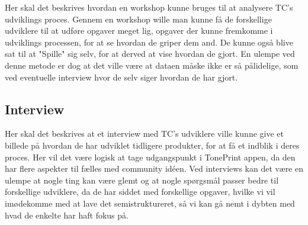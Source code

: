 Her skal det beskrives hvordan en workshop kunne bruges til at analysere TC's udviklings proces. Gennem en workshop wille man kunne få de forskellige udviklere til at udføre opgaver meget lig, opgaver der kunne fremkomme i udviklings processen, for at se hvordan de griper dem and. De kunne også blive sat til at "Spille" sig selv, for at derved at vise hvordan de gjort. En ulempe ved denne metode er dog at det ville være at dataen måske ikke er så pålidelige, som ved eventuelle interview hvor de selv siger hvordan de har gjort.

\subsection*{Interview}
\label{MethodInterview}
Her skal det beskrives at et interview med TC's udviklere ville kunne give et billede på hvordan de har udviklet tidligere produkter, for at få et indblik i deres proces. Her vil det være logisk at tage udgangspunkt i TonePrint appen, da den har flere aspekter til fælles med community idéen. Ved interviews kan det være en ulempe at nogle ting kan være glemt og at nogle spørgsmål passer bedre til forskellige udviklere, da de har siddet med forskellige opgaver, hvilke vi vil imødekomme med at lave det semistruktureret, så vi kan gå nemt i dybten med hvad de enkelte har haft fokus på. 

